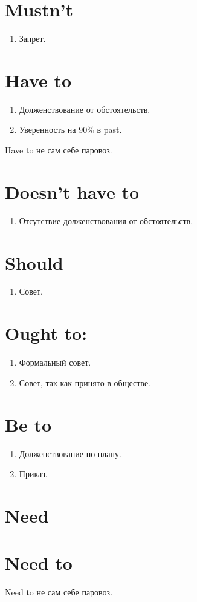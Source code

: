 \documentclass[oneside]{book}
\begin{document}
    \section{Mustn't}
    \begin{enumerate}
        \item Запрет.
    \end{enumerate}

    \section{Have to}
    \begin{enumerate}
        \item Долженствование от обстоятельств.
        \item Уверенность на 90\% в past.
    \end{enumerate}

    Have to не сам себе паровоз.

    \section{Doesn't have to}
    \begin{enumerate}
        \item Отсутствие долженствования от обстоятельств.
    \end{enumerate}

    \section{Should}
    \begin{enumerate}
        \item Совет.
    \end{enumerate}

    \section{Ought to:}
    \begin{enumerate}
        \item Формальный совет.
        \item Совет, так как принято в обществе.
    \end{enumerate}

    \section{Be to}
    \begin{enumerate}
        \item Долженствование по плану.
        \item Приказ.
    \end{enumerate}

    \section{Need}

    \section{Need to}
    Need to не сам себе паровоз.
\end{document}
